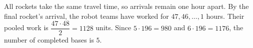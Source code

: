 All rockets take the same travel time, so arrivals remain one hour apart. By the final rocket's arrival, the robot teams have worked for $47,46,\ldots,1$ hours. Their pooled work is $\dfrac{47\cdot48}{2}=1128$ units. Since $5\cdot196=980$ and $6\cdot196=1176$, the number of completed bases is $\boxed5$.
